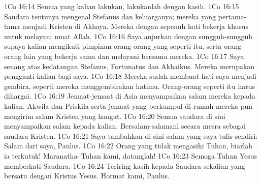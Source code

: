 1Co 16:14  Semua yang kalian lakukan, lakukanlah dengan kasih.
1Co 16:15  Saudara tentunya mengenal Stefanus dan keluarganya; mereka yang pertama-tama menjadi Kristen di Akhaya. Mereka dengan sepenuh hati bekerja khusus untuk melayani umat Allah.
1Co 16:16  Saya anjurkan dengan sungguh-sungguh supaya kalian mengikuti pimpinan orang-orang yang seperti itu, serta orang-orang lain yang bekerja sama dan melayani bersama mereka.
1Co 16:17  Saya senang atas kedatangan Stefanus, Fortunatus dan Akhaikus. Mereka merupakan pengganti kalian bagi saya.
1Co 16:18  Mereka sudah membuat hati saya menjadi gembira, seperti mereka menggembirakan hatimu. Orang-orang seperti itu harus dihargai.
1Co 16:19  Jemaat-jemaat di Asia menyampaikan salam mereka kepada kalian. Akwila dan Priskila serta jemaat yang berkumpul di rumah mereka pun mengirim salam Kristen yang hangat.
1Co 16:20  Semua saudara di sini menyampaikan salam kepada kalian. Bersalam-salamanl secara mesra sebagai saudara Kristen.
1Co 16:21  Saya tambahkan di sini salam yang saya tulis sendiri: Salam dari saya, Paulus.
1Co 16:22  Orang yang tidak mengasihi Tuhan, biarlah ia terkutuk! Maranatha--Tuhan kami, datanglah!
1Co 16:23  Semoga Tuhan Yesus memberkati Saudara.
1Co 16:24  Teriring kasih kepada Saudara sekalian yang bersatu dengan Kristus Yesus. Hormat kami, Paulus.


